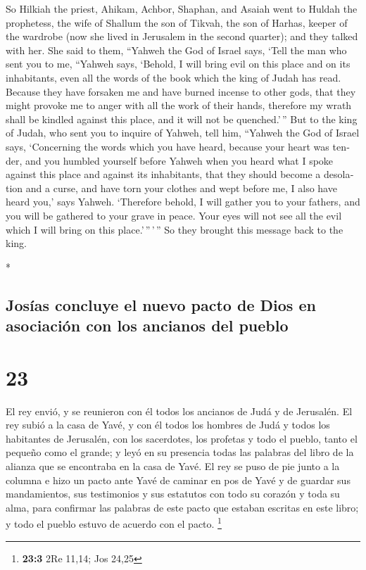 \begin{paracol}{2}
\begin{otherlanguage}{english}
 So Hilkiah the priest, Ahikam, Achbor, Shaphan, and
Asaiah went to Huldah the prophetess, the wife of Shallum the son of
Tikvah, the son of Harhas, keeper of the wardrobe (now she lived in
Jerusalem in the second quarter); and they talked with her.
 She said to them, ``Yahweh the God of Israel says, `Tell
the man who sent you to me,  ``Yahweh says, `Behold, I
will bring evil on this place and on its inhabitants, even all the words
of the book which the king of Judah has read.  Because
they have forsaken me and have burned incense to other gods, that they
might provoke me to anger with all the work of their hands, therefore my
wrath shall be kindled against this place, and it will not be
quenched.'\,''  But to the king of Judah, who sent you to
inquire of Yahweh, tell him, ``Yahweh the God of Israel says,
`Concerning the words which you have heard,  because your
heart was tender, and you humbled yourself before Yahweh when you heard
what I spoke against this place and against its inhabitants, that they
should become a desolation and a curse, and have torn your clothes and
wept before me, I also have heard you,' says Yahweh. 
`Therefore behold, I will gather you to your fathers, and you will be
gathered to your grave in peace. Your eyes will not see all the evil
which I will bring on this place.'\,''\,'\,'' So they brought this
message back to the king.

\end{otherlanguage}

\switchcolumn[0]*

\hypertarget{josuxedas-concluye-el-nuevo-pacto-de-dios-en-asociaciuxf3n-con-los-ancianos-del-pueblo}{%
\subsection{Josías concluye el nuevo pacto de Dios en asociación con los
ancianos del
pueblo}\label{josuxedas-concluye-el-nuevo-pacto-de-dios-en-asociaciuxf3n-con-los-ancianos-del-pueblo}}

\hypertarget{section-44}{%
\section{23}\label{section-44}}

 El rey envió, y se reunieron con él todos los ancianos de
Judá y de Jerusalén.  El rey subió a la casa de Yavé, y
con él todos los hombres de Judá y todos los habitantes de Jerusalén,
con los sacerdotes, los profetas y todo el pueblo, tanto el pequeño como
el grande; y leyó en su presencia todas las palabras del libro de la
alianza que se encontraba en la casa de Yavé.  El rey se
puso de pie junto a la columna e hizo un pacto ante Yavé de caminar en
pos de Yavé y de guardar sus mandamientos, sus testimonios y sus
estatutos con todo su corazón y toda su alma, para confirmar las
palabras de este pacto que estaban escritas en este libro; y todo el
pueblo estuvo de acuerdo con el pacto. \footnote{\textbf{23:3} 2Re
  11,14; Jos 24,25}


\end{paracol}
